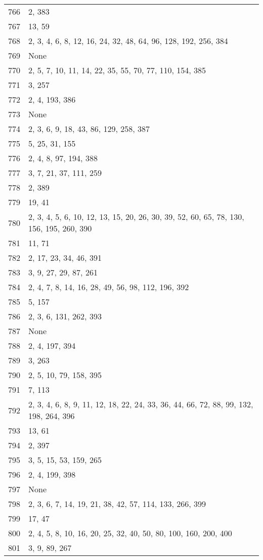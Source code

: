 \documentclass[12pt]{article}
\begin{document}
\begin{tabular}{|r|l|}
766 & 2, 383 \\ 
767 & 13, 59 \\ 
768 & 2, 3, 4, 6, 8, 12, 16, 24, 32, 48, 64, 96, 128, 192, 256, 384 \\ 
769 & None \\ 
770 & 2, 5, 7, 10, 11, 14, 22, 35, 55, 70, 77, 110, 154, 385 \\ 
771 & 3, 257 \\ 
772 & 2, 4, 193, 386 \\ 
773 & None \\ 
774 & 2, 3, 6, 9, 18, 43, 86, 129, 258, 387 \\ 
775 & 5, 25, 31, 155 \\ 
776 & 2, 4, 8, 97, 194, 388 \\ 
777 & 3, 7, 21, 37, 111, 259 \\ 
778 & 2, 389 \\ 
779 & 19, 41 \\ 
780 & 2, 3, 4, 5, 6, 10, 12, 13, 15, 20, 26, 30, 39, 52, 60, 65, 78, 130, 156, 195,  260, 390 \\ 
781 & 11, 71 \\ 
782 & 2, 17, 23, 34, 46, 391 \\ 
783 & 3, 9, 27, 29, 87, 261 \\ 
784 & 2, 4, 7, 8, 14, 16, 28, 49, 56, 98, 112, 196, 392 \\ 
785 & 5, 157 \\ 
786 & 2, 3, 6, 131, 262, 393 \\ 
787 & None \\ 
788 & 2, 4, 197, 394 \\ 
789 & 3, 263 \\ 
790 & 2, 5, 10, 79, 158, 395 \\ 
791 & 7,  113 \\ 
792 & 2, 3, 4, 6, 8, 9, 11, 12, 18, 22, 24, 33, 36, 44, 66,  72, 88, 99, 132, 198, 264, 396 \\ 
793 & 13, 61 \\ 
794 & 2, 397 \\ 
795 & 3, 5, 15, 53, 159, 265 \\ 
796 & 2, 4, 199, 398 \\ 
797 & None \\ 
798 & 2, 3, 6, 7,  14, 19, 21, 38, 42, 57, 114, 133,  266, 399 \\ 
799 & 17, 47 \\ 
800 & 2, 4, 5, 8, 10, 16, 20, 25, 32, 40, 50, 80, 100, 160, 200, 400 \\ 
801 & 3, 9, 89, 267 \\ 

\end{tabular}
\end{document}
